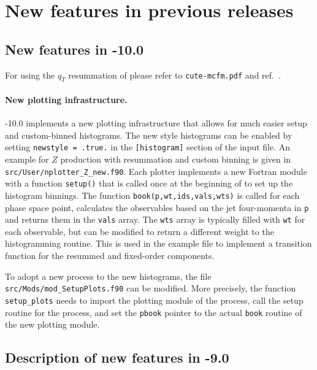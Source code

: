 \section{New features in previous releases}
\label{mcfm9plus}

\subsection{New features in \MCFM{}-10.0}

For using the $q_T$ resummation of \CuTeMCFM{} please refer to \texttt{cute-mcfm.pdf}
and ref.~\cite{Becher:2020ugp}.

\paragraph{New plotting infrastructure.}
\MCFM{}-10.0 implements a new plotting infrastructure that allows for much easier setup
and custom-binned histograms. The new style histograms can be enabled by setting \texttt{newstyle = 
.true.} in the \texttt{[histogram]} section of the input file. An example for $Z$ production with 
resummation and custom binning is given in \texttt{src/User/nplotter\_Z\_new.f90}. Each plotter
implements a new Fortran module with a function \texttt{setup()} that is called once at the 
beginning of \MCFM{} to set up the histogram binnings. The function 
\texttt{book(p,wt,ids,vals,wts)} is called for each phase space point, calculates the observables 
based on the jet four-momenta in \texttt{p} and returns them in the \texttt{vals} array. The 
\texttt{wts} array is typically filled with \texttt{wt} for each observable, but can be modified to 
return a different weight to the histogramming routine. This is used in the example file to 
implement a transition function for the resummed and fixed-order components.

To adopt a new process to the new histograms, the file \texttt{src/Mods/mod\_SetupPlots.f90}
can be modified. More precisely, the function \texttt{setup\_plots} needs to import the plotting 
module of the process, call the setup routine for the process, and set the \texttt{pbook} pointer
to the actual \texttt{book} routine of the new plotting module.

\subsection{Description of new features in \MCFM{}-9.0}
\label{sec:newfeatures-app}


